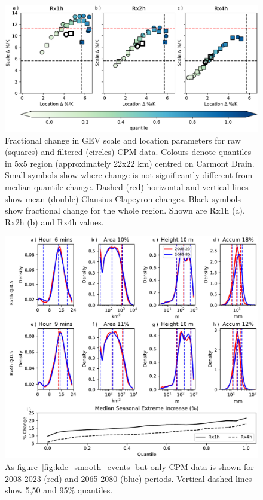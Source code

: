 \documentclass[11pt,a4paper]{article}
\begin{document}
\begin{figure}[ht!]
	\centering
	\includegraphics[width=\linewidth]{carmont_gev_quant_change}
	\caption{
		Fractional change in GEV scale  and location parameters for raw (squares) and filtered (circles) CPM data. 
				Colours denote quantiles in 5x5 region (approximately 22x22 km) centred on Carmont Drain. 
				Small symbols show where change is not significantly different from median quantile change.
				Dashed (red) horizontal and vertical lines show mean (double) Clausius-Clapeyron changes.
				Black symbols show fractional change for the whole region.  
				Shown are Rx1h (a), Rx2h (b) and Rx4h values.
	}
	\label{fig:carmont_gev_quant_change}
\end{figure}
\clearpage
\begin{figure}[h!]
	\centering
	\includegraphics[width=\linewidth]{kde_smooth_events_2065_2080}
	\caption{As figure~\ref{fig:kde_smooth_events} but only CPM data is shown for 2008-2023 (red) and 2065-2080 (blue) periods. Vertical dashed lines show 5,50 and 95\% quantiles. }
	\label{fig:kde_smooth_events_2065_2080}
\end{figure}
\end{document}
